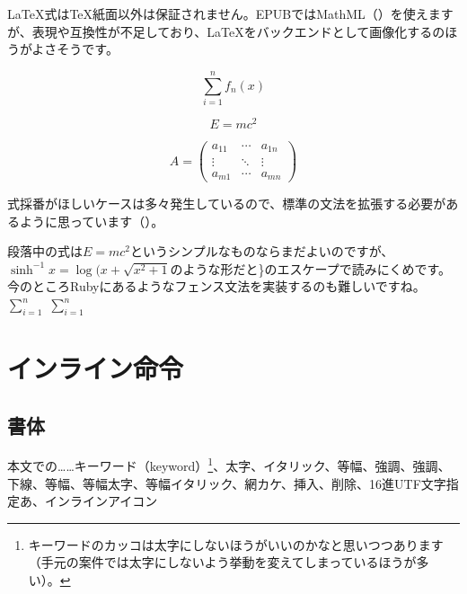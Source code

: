 LaTeX式はTeX紙面以外は保証されません。EPUBではMathML（）を使えますが、表現や互換性が不足しており、LaTeXをバックエンドとして画像化するのほうがよさそうです。

\begin{equation*}
\sum_{i=1}^nf_n(x)
\end{equation*}

\begin{reviewequationblock}
\begin{equation*}
E=mc^2
\end{equation*}
\end{reviewequationblock}

\begin{equation*}
A = \left(
\begin{array}{ccc}
a_{11} & \cdots & a_{1n} \\
\vdots & \ddots & \vdots \\
a_{m1} & \cdots & a_{mn}
\end{array}
\right)
\end{equation*}

式採番がほしいケースは多々発生しているので、標準の文法を拡張する必要があるように思っています（）。

段落中の式は$E=mc^2$というシンプルなものならまだよいのですが、$\sinh^{-1} x = \log(x + \sqrt{x^2 + 1}$のような形だと\}のエスケープで読みにくめです。今のところRubyにあるようなフェンス文法を実装するのも難しいですね。$\sum_{i=1}^n$ $\displaystyle\sum_{i=1}^n$

\section{インライン命令}
\label{sec:2-4}
\label{inlineop}

\subsection{書体}
\label{sec:2-4-1}

本文での……キーワード（keyword）\footnote{キーワードのカッコは太字にしないほうがいいのかなと思いつつあります（手元の案件では太字にしないよう挙動を変えてしまっているほうが多い）。}、太字、イタリック、等幅、強調、強調、下線、等幅、等幅太字、等幅イタリック、網カケ、挿入、削除、16進UTF文字指定あ、インラインアイコン

